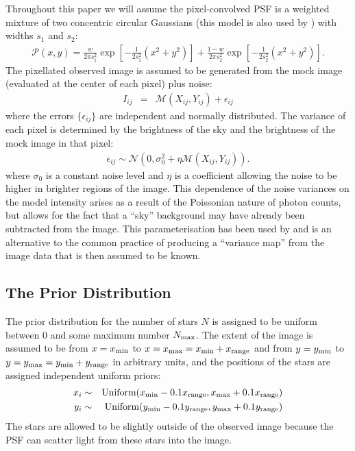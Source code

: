 \documentclass[12pt, preprint]{aastex}
\begin{document}
Throughout this paper we will
assume the pixel-convolved PSF is a weighted mixture of two concentric
circular
Gaussians (this model is also used by \citet{1987PASP...99..191S}) with widths
$s_1$ and $s_2$:
\begin{eqnarray}
\mathcal{P}(x, y) = \frac{w}{2\pi s_1^2}\exp
\left[
-\frac{1}{2s_1^2}\left(x^2 + y^2\right)
\right]
+ \frac{1-w}{2\pi s_2^2}\exp
\left[-\frac{1}{2s_2^2}\left(x^2 + y^2\right)
\right].
\end{eqnarray}
The pixellated observed image is assumed to be generated from the mock
image (evaluated at the center of each pixel) plus noise:
\begin{eqnarray}
I_{ij} &=& \mathcal{M}(X_{ij}, Y_{ij}) + \epsilon_{ij}
\end{eqnarray}
where the errors $\{\epsilon_{ij}\}$ are independent and normally distributed.
The variance of each pixel is determined by the brightness of the sky and the
brightness of the mock image in that pixel:
\begin{eqnarray}
\epsilon_{ij} \sim \mathcal{N}(0, \sigma_0^2 + \eta \mathcal{M}(X_{ij}, Y_{ij})).
\end{eqnarray}
where $\sigma_0$ is a constant noise level and $\eta$ is a coefficient allowing
the noise to be higher in brighter regions of the image. This dependence of the
noise variances on the model intensity arises as a result of the Poissonian
nature of photon counts, but allows for the fact that a ``sky'' background may
have already been subtracted from the image.
This parameterisation has been used by \citet{2011MNRAS.412.2521B} and is an
alternative to the common practice of producing a ``variance map'' from the
image data that is then assumed to be known.

\subsection{The Prior Distribution}
The prior distribution for the number of stars $N$ is assigned to be uniform
between 0 and some maximum number $N_{\rm max}$. The extent of the image is
assumed to be from $x=x_{\rm min}$ to $x=x_{\rm max}=x_{\rm min} + x_{\rm range}$ and from
$y=y_{\rm min}$ to $y=y_{\rm max}=y_{\rm min} + y_{\rm range}$ in arbitrary units, and the
positions of the stars are assigned independent uniform priors:
\begin{eqnarray}
x_i &\sim& \textnormal{Uniform}(x_{\rm min} - 0.1x_{\rm range}, x_{\rm max} + 0.1x_{\rm range}) \\
y_i &\sim& \textnormal{Uniform}(y_{\rm min} - 0.1y_{\rm range}, y_{\rm max} + 0.1y_{\rm range})
\end{eqnarray}
The stars are allowed to be slightly outside of the observed image because the
PSF can scatter light from these stars into the image.
\end{document}
